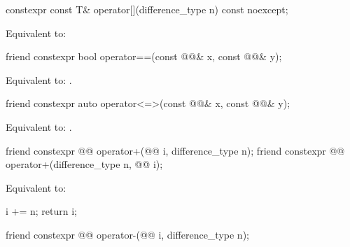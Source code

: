 %
\begin{itemdecl}
constexpr const T& operator[](difference_type n) const noexcept;
\end{itemdecl}

\begin{itemdescr}
\pnum
\effects
Equivalent to: 
\end{itemdescr}

%
\begin{itemdecl}
friend constexpr bool operator==(const @@& x, const @@& y);
\end{itemdecl}

\begin{itemdescr}
\pnum
\effects
Equivalent to: .
\end{itemdescr}

%
\begin{itemdecl}
friend constexpr auto operator<=>(const @@& x, const @@& y);
\end{itemdecl}

\begin{itemdescr}
\pnum
\effects
Equivalent to: .
\end{itemdescr}

%
\begin{itemdecl}
friend constexpr @@ operator+(@@ i, difference_type n);
friend constexpr @@ operator+(difference_type n, @@ i);
\end{itemdecl}

\begin{itemdescr}
\pnum
\effects
Equivalent to:
\begin{codeblock}
i += n;
return i;
\end{codeblock}
\end{itemdescr}

%
\begin{itemdecl}
friend constexpr @@ operator-(@@ i, difference_type n);
\end{itemdecl}

